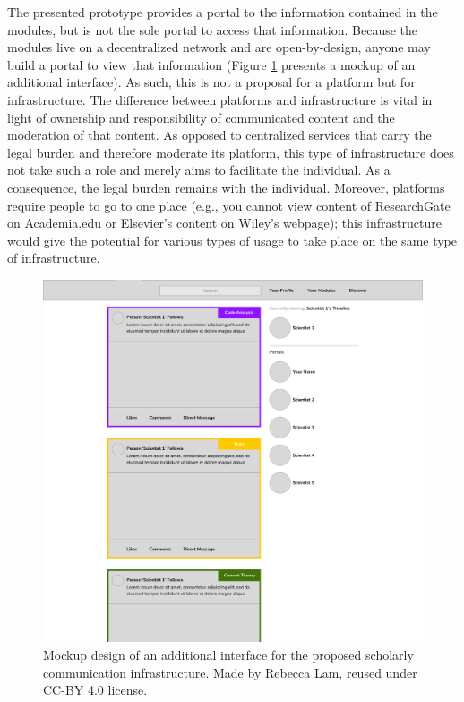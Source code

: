 \documentclass[publications,article,submit,moreauthors,pdftex,10pt,a4paper]{Definitions/mdpi}
\begin{document}
The presented prototype provides a portal to the information contained
in the modules, but is not the sole portal to access that information.
Because the modules live on a decentralized network and are
open-by-design, anyone may build a portal to view that information
(Figure \ref{fig:datcom-fig6} presents a mockup of an additional
interface). As such, this is not a proposal for a platform but for
infrastructure. The difference between platforms and infrastructure is
vital in light of ownership and responsibility of communicated content
and the moderation of that content. As opposed to centralized services
that carry the legal burden and therefore moderate its platform, this
type of infrastructure does not take such a role and merely aims to
facilitate the individual. As a consequence, the legal burden remains
with the individual. Moreover, platforms require people to go to one
place (e.g., you cannot view content of ResearchGate on Academia.edu or
Elsevier's content on Wiley's webpage); this infrastructure would give
the potential for various types of usage to take place on the same type
of infrastructure.

\begin{figure}
\centering
\includegraphics{mockup-1a.png}
\caption{Mockup design of an additional interface for the proposed
scholarly communication infrastructure. Made by Rebecca Lam, reused
under CC-BY 4.0 license.}
\label{fig:datcom-fig6}
\end{figure}
\end{document}
